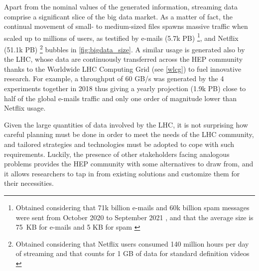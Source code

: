Apart from the nominal values of the generated information, streaming data comprise a significant slice of the big data market.
As a matter of fact, the continual movement of small- to medium-sized files spawns massive traffic when scaled up to millions of users, as testified by e-mails (5.7k PB)%
\footnote{Obtained considering that 71k billion e-mails and 60k billion spam messages were sent from October 2020 to September 2021 \cite{statista2021mails}, and that the average size is \mbox{75 KB} for e-mails \cite{lifewire2021avg_mail} and \mbox{5} KB for spam \cite{medium2014avg_spam}
},
and Netflix (51.1k PB)%
\footnote{Obtained considering that Netflix users consumed 140 million hours per day of streaming \cite{domo2021infographic} and that counts for 1 GB of data for standard definition videos \cite{perry2021netflix}
} bubbles in \cref{fig:bigdata_size}.
A similar usage is generated also by the LHC, whose data are continuously transferred across the HEP community thanks to the Worldwide LHC Computing Grid (see \cref{wlcg}) to fuel innovative research. For example, 
a throughput of 60 GB/s was generated by the 4 experiments together in 2018 \cite{wlcg2018throughput} thus giving a yearly projection (1.9k PB) close to half of the global e-mails traffic and only one order of magnitude lower than Netflix usage.

Given the large quantities of data involved by the LHC, it is not surprising how careful planning must be done in order to meet the needs of the LHC community, and tailored strategies and technologies must be adopted to cope with such requirements. 
Luckily, the presence of other stakeholders facing analogous problems provides the HEP community with some alternatives to draw from, and it allows researchers to tap in from existing solutions and customize them for their necessities.